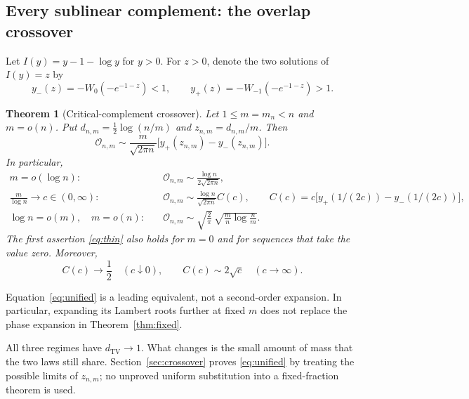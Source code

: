 \documentclass[11pt,a4paper]{article}
\numberwithin{equation}{section}
\newtheorem{theorem}{Theorem}[section]
\theoremstyle{definition}
\theoremstyle{remark}
\newcommand{\TV}{d_{\mathrm{TV}}}
\newcommand{\ov}{\mathcal O}
\begin{document}
\subsection{Every sublinear complement: the overlap crossover}
Let $I(y)=y-1-\log y$ for $y>0$. For $z>0$, denote the two solutions of
$I(y)=z$ by
\begin{equation}\label{eq:roots}
y_-(z)=-W_0(-e^{-1-z})<1,
\qquad y_+(z)=-W_{-1}(-e^{-1-z})>1.
\end{equation}
\begin{theorem}[Critical-complement crossover]\label{thm:crossover}
Let $1\le m=m_n<n$ and $m=o(n)$. Put
$d_{n,m}=\tfrac12\log(n/m)$ and $z_{n,m}=d_{n,m}/m$. Then
\begin{equation}\label{eq:unified}
\ov_{n,m}\sim\frac{m}{\sqrt{2\pi n}}
   \bigl[y_+(z_{n,m})-y_-(z_{n,m})\bigr].
\end{equation}
In particular,
\begin{align}
m=o(\log n):\quad
&\ov_{n,m}\sim\frac{\log n}{2\sqrt{2\pi n}},
\label{eq:thin}\\
\frac m{\log n}\to c\in(0,\infty):\quad
&\ov_{n,m}\sim\frac{\log n}{\sqrt{2\pi n}}C(c),\qquad
 C(c)=c\bigl[y_+(1/(2c))-y_-(1/(2c))\bigr],
\label{eq:critical}\\
\log n=o(m),\quad m=o(n):\quad
&\ov_{n,m}\sim\sqrt{\frac2\pi}\,
        \sqrt{\frac mn\log\frac nm}.
\label{eq:gaussian}
\end{align}
The first assertion \eqref{eq:thin} also holds for $m=0$ and for sequences
that take the value zero. Moreover,
\begin{equation}\label{eq:Cends}
C(c)\longrightarrow\frac12\quad(c\downarrow0),\qquad
C(c)\sim2\sqrt c\quad(c\to\infty).
\end{equation}
\end{theorem}
Equation~\eqref{eq:unified} is a leading equivalent, not a second-order
expansion. In particular, expanding its Lambert roots further at fixed
$m$ does not replace the phase expansion in Theorem~\ref{thm:fixed}.

All three regimes have $\TV\to1$. What changes is the small amount of
mass that the two laws still share. Section~\ref{sec:crossover} proves
\eqref{eq:unified} by treating the possible limits of $z_{n,m}$; no
unproved uniform substitution into a fixed-fraction theorem is used.
\end{document}
